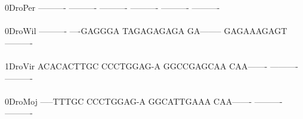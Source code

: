 \documentclass[11pt,twoside,reqno,a4paper]{article}
\begin{document}
{0\hspace*{3\charwidth}DroPer	----------	----------	----------	----------	----------	----------	\\
\hspace*{4\charwidth}\hspace*{7\charwidth}\hspace*{1\charwidth}\hspace*{1\charwidth}\hspace*{1\charwidth}\hspace*{1\charwidth}\hspace*{1\charwidth}\hspace*{1\charwidth}\\
0\hspace*{3\charwidth}DroWil	----------	----GAGGGA	TAGAGAGAGA	GA--------	GAGAAAGAGT	----------	\\
\hspace*{4\charwidth}\hspace*{7\charwidth}\hspace*{1\charwidth}\hspace*{1\charwidth}\hspace*{1\charwidth}\hspace*{1\charwidth}\hspace*{1\charwidth}\hspace*{1\charwidth}\\
1\hspace*{3\charwidth}DroVir	ACACACTTGC	CCCTGGAG-A	GGCCGAGCAA	CAA-------	----------	----------	\\
\hspace*{4\charwidth}\hspace*{7\charwidth}\hspace*{1\charwidth}\hspace*{1\charwidth}\hspace*{1\charwidth}\hspace*{1\charwidth}\hspace*{1\charwidth}\hspace*{1\charwidth}\\
0\hspace*{3\charwidth}DroMoj	-----TTTGC	CCCTGGAG-A	GGCATTGAAA	CAA-------	----------	----------	\\
\hspace*{4\charwidth}\hspace*{7\charwidth}\hspace*{1\charwidth}\hspace*{1\charwidth}\hspace*{1\charwidth}\hspace*{1\charwidth}\hspace*{1\charwidth}\hspace*{1\charwidth}\\
}
\end{document}
